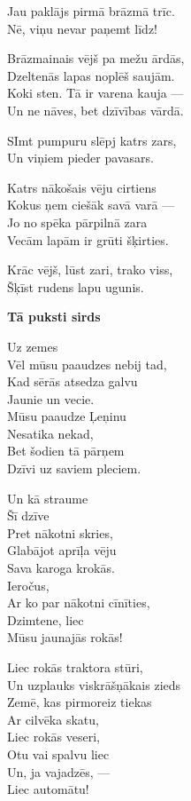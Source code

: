 \documentclass[11pt]{article}
\begin{document}
{Jau paklājs pirmā brāzmā trīc.\\
Nē, viņu nevar paņemt līdz!

Brāzmainais vējš pa mežu ārdās,\\
Dzeltenās lapas noplēš saujām.\\
Koki sten. Tā ir varena kauja ---\\
Un ne nāves, bet dzīvības vārdā.

SImt pumpuru slēpj katrs zars,\\
Un viņiem pieder pavasars.

Katrs nākošais vēju cirtiens\\
Kokus ņem ciešāk savā varā ---\\
Jo no spēka pārpilnā zara\\
Vecām lapām ir grūti šķirties.

Krāc vējš, lūst zari, trako viss,\\
Šķīst rudens lapu ugunis.


\newpage

{\bf Tā puksti sirds}

Uz zemes\\
Vēl mūsu paaudzes nebij tad,\\
Kad sērās atsedza galvu\\
Jaunie un vecie.\\
Mūsu paaudze Ļeņinu\\
Nesatika nekad,\\
Bet šodien tā pārņem\\
Dzīvi uz saviem pleciem.

Un kā straume\\
Šī dzīve\\
Pret nākotni skries,\\
Glabājot aprīļa vēju\\
Sava karoga krokās.\\
Ieročus,\\
Ar ko par nākotni cīnīties,\\
Dzimtene, liec\\
Mūsu jaunajās rokās!

Liec rokās traktora stūri,\\
Un uzplauks viskrāšņākais zieds\\
Zemē, kas pirmoreiz tiekas\\
Ar cilvēka skatu,\\
Liec rokās veseri,\\
Otu vai spalvu liec\\
Un, ja vajadzēs, ---\\
Liec automātu!

}
\end{document}
